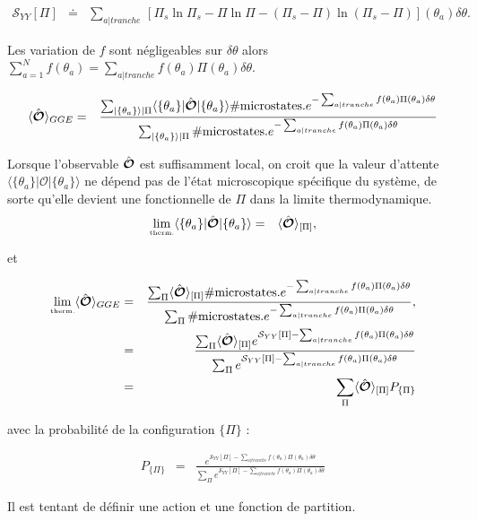 \begin{eqnarray}
    \mathcal{S}_{YY}[\Pi] & \doteq & \sum_{a\vert tranche} \, [ \Pi_s\ln \Pi_s - \Pi \ln \Pi - ( \Pi_s - \Pi ) \ln ( \Pi_s - \Pi ) ] (\theta_a) \delta \theta .
\end{eqnarray}
	
	Les variation de $f$ sont négligeables sur $\delta \theta $ alors  $\sum_{a = 1}^N  f(\theta_a) = \sum_{a \vert tranche } f(\theta_a) \Pi( \theta_a)\delta \theta$.
	
	
	\begin{eqnarray}
		\langle \hat{\bm{\mathcal{O}}} \rangle_{GGE} & =  & \frac{  \sum_{\vert \{\theta_a \}\rangle \vert \Pi } \langle  \{ \theta_a\}  \vert   \hat{\bm{\mathcal{O}}} \vert \{ \theta_a\} \rangle \# \mbox{microstates.} e^{- \sum_{a \vert tranche} f(\theta_a) \Pi ( \theta_a )  \delta \theta}    }{ \sum_{\vert \{\theta_a \}\rangle \vert \Pi }  \# \mbox{microstates.}e^{- \sum_{a \vert tranche }  f(\theta_a) \Pi ( \theta_a ) \delta \theta } }
	\end{eqnarray}
	
	Lorsque l'observable $\hat{\bm{\mathcal{O}}}$ est suffisamment local, on croit que la valeur d'attente $\langle  \{ \theta_a\}  \vert   \mathcal{O} \vert \{ \theta_a\} \rangle$ ne dépend pas de l'état microscopique spécifique du système, de sorte qu'elle devient une fonctionnelle de $\Pi$ dans la limite thermodynamique.
	\begin{eqnarray}
		\underset{\mbox{\tiny therm.}}{\lim} \langle  \{ \theta_a\}  \vert   \hat{\bm{\mathcal{O}}} \vert \{ \theta_a\} \rangle & = & \langle \hat{\bm{\mathcal{O}}}\rangle_{[\Pi]},
	\end{eqnarray}
	
	et 
	
	\begin{eqnarray}
		\underset{\mbox{\tiny therm.}}{\lim} \langle \hat{\bm{\mathcal{O}}} \rangle_{GGE} & =  & \frac{ \sum_{\Pi} \langle \hat{\bm{\mathcal{O}}}\rangle_{[\Pi]} \# \mbox{microstates.} e^{- \sum_{a \vert tranche} f(\theta_a) \Pi ( \theta_a )  \delta \theta}    }{ \sum_{\Pi} \# \mbox{microstates.}  e^{- \sum_{a \vert tranche }  f(\theta_a) \Pi ( \theta_a ) \delta \theta } },\\
		& = & \frac{ \sum_{\Pi} \langle \hat{\bm{\mathcal{O}}}\rangle_{[\Pi]}  e^{ \mathcal{S}_{YY}[\Pi]- \sum_{a \vert tranche} f(\theta_a) \Pi ( \theta_a )  \delta \theta}    }{ \sum_{\Pi}  e^{\mathcal{S}_{YY}[\Pi] - \sum_{a \vert tranche }  f(\theta_a) \Pi ( \theta_a ) \delta \theta } }\\
		& = &  \sum_{\Pi} \langle \hat{\bm{\mathcal{O}}}\rangle_{[\Pi]} P_{\{\Pi\}}
	\end{eqnarray}
	
	avec la probabilité de la configuration $\{ \Pi \}$  : 
	
	\begin{eqnarray}
		P_{\{\Pi\}} & = & \frac{e^{\mathcal{S}_{YY}[\Pi] - \sum_{a \vert tranche }  f(\theta_a) \Pi ( \theta_a ) \delta \theta }}{ \sum_{\Pi}  e^{\mathcal{S}_{YY}[\Pi] - \sum_{a \vert tranche }  f(\theta_a) \Pi ( \theta_a ) \delta \theta } }
	\end{eqnarray}
	
	Il est tentant de définir une action  et une fonction de partition.